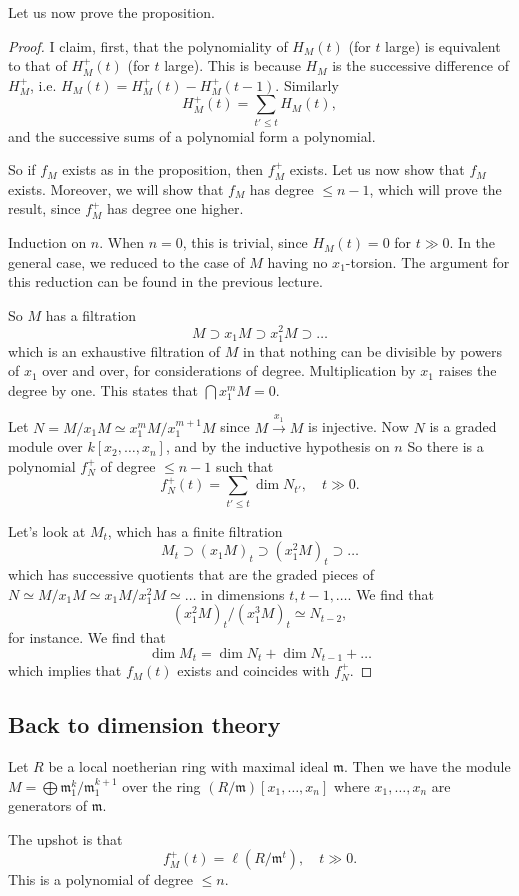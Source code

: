 Let us now prove the proposition.
\begin{proof} 
I claim, first, that the polynomiality of $H_M(t)$ (for $t$ large) is
equivalent to that of $H_M^+(t)$ (for $t$ large). This is because $H_M$ is the successive
difference of $H_M^+$, i.e. $H_M(t) = H_M^+(t) - H_M^+(t-1)$. 
Similarly
\[ H_M^+(t) = \sum_{t' \leq t} H_M(t), \]
and the successive sums of a polynomial form a polynomial. 

So if $f_M$ exists as in the proposition, then $f_M^+$ exists. Let us now show that $f_M$ exists.
Moreover, we will show that $f_M$ has degree $\leq n-1$, which will prove the
result, since $f_M^+$ has degree one higher.

Induction on $n$. 
When $n=0$, this is trivial, since $H_M(t) = 0$ for $t \gg 0$. In the general
case, we reduced to the case of $M$ having no $x_1$-torsion. The argument for
this reduction can be found in the previous lecture. 

So $M$ has a filtration
\[ M \supset x_1 M \supset x_1^2 M \supset \dots  \]
which is an exhaustive filtration of $M$ in that nothing can be divisible by
powers of $x_1$ over and over, for considerations of degree. Multiplication by
$x_1$ raises the degree by one. This states that $\bigcap x_1^m M = 0$. 

Let $N = M/x_1 M \simeq x_1^m M/x_1^{m+1} M$ since $M \stackrel{x_1}{\to} M$ is
injective. Now $N$ is a graded module over $k[x_2, \dots, x_n]$, and by the
inductive hypothesis on $n$
So there is a polynomial $f_N^+$ of degree $\leq n-1$ such that
\[ f_N^+(t) = \sum_{t' \leq t} \dim N_{t'}, \quad t \gg 0.  \]

Let's look at $M_t$, which has a finite filtration 
\[ M_t \supset (x_1 M)_t \supset (x_1^2 M)_t \supset \dots  \]
which has successive quotients that are the  graded pieces of $N \simeq
M/x_1 M \simeq x_1 M/x_1^2 M \simeq \dots$ in dimensions $t, t-1, \dots$. We
find that
\[ (x_1^2 M)_t/(x_1^3 M)_t \simeq N_{t-2},  \]
for instance. We find that
\[ \dim M_t = \dim N_t + \dim N_{t-1} + \dots  \]
which implies that $f_M(t)$ exists and coincides with $f_N^+$. 
\end{proof} 

\subsection{Back to dimension theory}
\begin{example} 
Let $R $ be a local noetherian ring with maximal ideal $\mathfrak{m}$. Then we
have the module $M = \bigoplus \mathfrak{m}_1^k/\mathfrak{m}_1^{k+1}$ over the ring
$(R/\mathfrak{m})[x_1, \dots, x_n]$ where $x_1, \dots, x_n$ are generators of
$\mathfrak{m}$.

The upshot is that 
\[ f_M^+(t) = \ell(R/\mathfrak{m}^t), \quad t \gg 0.  \]
This is a polynomial of degree $\leq n$.
\end{example} 

